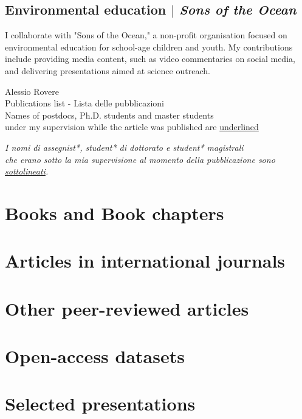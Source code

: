 \documentclass[11pt]{article}
\begin{document}
\subsection{Environmental education  $|$ {\normalfont\textit{Sons of the Ocean}}}
{\footnotesize I collaborate with "Sons of the Ocean," a non-profit organisation focused on environmental education for school-age children and youth. My contributions include providing media content, such as video commentaries on social media, and delivering presentations aimed at science outreach.}
\bigskip

\newpage

\begin{center}
    {\fontsize{36}{36}\selectfont\interthin Alessio \interheavy Rovere} \\ \bigskip
    {\fontsize{14}{14}\selectfont\interthin Publications list - Lista delle pubblicazioni}\\ \bigskip
        {\color{icnclr}} {Names of postdocs, Ph.D. students and master students \\ under my supervision while the article was published are \underline{underlined}}
\bigskip

        {\color{icnclr}} \textit{{I nomi di assegnist*, student* di dottorato e student* magistrali \\ che erano sotto la mia supervisione al momento della pubblicazione sono \underline{sottolineati}.}}



\end{center}

\nocite{*}
\section{Books and Book chapters}
\printbibliography[type=book,heading=none]

\section{Articles in international journals}
\printbibliography[type=article,heading=none]

\section{Other peer-reviewed articles}
\printbibliography[type=periodical,heading=none]

\section{Open-access datasets}
\printbibliography[type=dataset,heading=none]

\section{Selected presentations}
\printbibliography[type=misc,heading=none]
\end{document}
